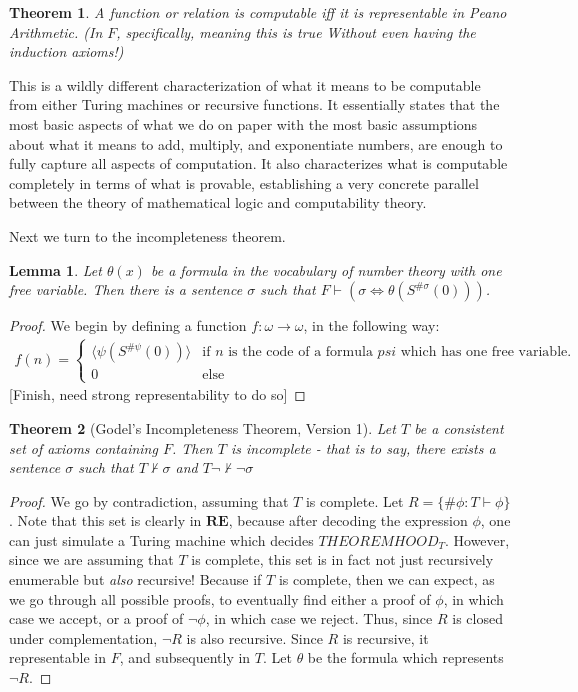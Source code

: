 \documentclass{article}
\theoremstyle{definition}
\theoremstyle{plain}
\theoremstyle{theorem}
\newtheorem{lemma}{Lemma}[section]
\newtheorem{theorem}{Theorem}[section]
\begin{document}
\begin{theorem}
    A function or relation is computable iff it is representable in Peano Arithmetic. (In $F$, specifically, meaning this is true Without even having the induction axioms!)
\end{theorem}
This is a wildly different characterization of what it means to be computable from either Turing machines or recursive functions. It essentially states that the most basic aspects of what we do on paper with the most basic assumptions about what it means to add, multiply, and exponentiate numbers, are enough to fully capture all aspects of computation. It also characterizes what is computable completely in terms of what is provable, establishing a very concrete parallel between the theory of mathematical logic and computability theory. 
\par Next we turn to the incompleteness theorem. 
\begin{lemma}
    Let $\theta(x)$ be a formula in the vocabulary of number theory with one free variable. Then there is a sentence $\sigma$ such that $F \vdash (\sigma \iff \theta(S^{\#\sigma}(0)))$. 
\end{lemma}
\begin{proof}
    We begin by defining a function $f: \omega \to \omega$, in the following way:
    \begin{align}
        f(n) = \begin{cases}
                   \langle \psi(S^{\#\psi}(0)) \rangle & \textrm{if $n$ is the code of a formula $psi$ which has one free variable.} \\
                   0 & \textrm{else}
        \end{cases}
    \end{align}
    [Finish, need strong representability to do so]
\end{proof}
\begin{theorem}[Godel's Incompleteness Theorem, Version 1]
    Let $T$ be a consistent set of axioms containing $F$. Then $T$ is incomplete - that is to say, there exists a sentence $\sigma$ such that $T \nvdash \sigma$ and $T \neg \nvdash \neg \sigma$
\end{theorem}
\begin{proof}
    We go by contradiction, assuming that $T$ is complete. Let $R = \{\# \phi: T \vdash \phi\}$. Note that this set is clearly in $\textbf{RE}$, because after decoding the expression $\phi$, one can just simulate a Turing machine which decides $THEOREMHOOD_T$. However, since we are assuming that $T$ is complete, this set is in fact not just recursively enumerable but \textit{also} recursive! Because if $T$ is complete, then we can expect, as we go through all possible proofs, to eventually find either a proof of $\phi$, in which case we accept, or a proof of $\neg \phi$, in which case we reject. Thus, since $R$ is closed under complementation, $\neg R$ is also recursive. 
    Since $R$ is recursive, it representable in $F$, and subsequently in $T$. Let $\theta$ be the formula which represents $\neg R$.
\end{proof}
\end{document}

